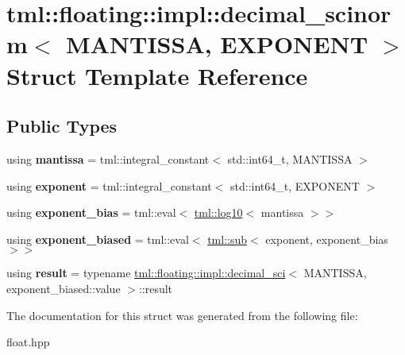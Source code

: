 \hypertarget{structtml_1_1floating_1_1impl_1_1decimal__scinorm}{\section{tml\+:\+:floating\+:\+:impl\+:\+:decimal\+\_\+scinorm$<$ M\+A\+N\+T\+I\+S\+S\+A, E\+X\+P\+O\+N\+E\+N\+T $>$ Struct Template Reference}
\label{structtml_1_1floating_1_1impl_1_1decimal__scinorm}
}
\subsection*{Public Types}
\begin{DoxyCompactItemize}
\item 
\hypertarget{structtml_1_1floating_1_1impl_1_1decimal__scinorm_a43b2abaea5ea0479eda2b942c8bf1ec8}{using {\bfseries mantissa} = tml\+::integral\+\_\+constant$<$ std\+::int64\+\_\+t, M\+A\+N\+T\+I\+S\+S\+A $>$}\label{structtml_1_1floating_1_1impl_1_1decimal__scinorm_a43b2abaea5ea0479eda2b942c8bf1ec8}

\item 
\hypertarget{structtml_1_1floating_1_1impl_1_1decimal__scinorm_ac8a1326c795a866dfc4bf527764b4558}{using {\bfseries exponent} = tml\+::integral\+\_\+constant$<$ std\+::int64\+\_\+t, E\+X\+P\+O\+N\+E\+N\+T $>$}\label{structtml_1_1floating_1_1impl_1_1decimal__scinorm_ac8a1326c795a866dfc4bf527764b4558}

\item 
\hypertarget{structtml_1_1floating_1_1impl_1_1decimal__scinorm_aae5e4b1eadec2dd82c9b692ad98eb03d}{using {\bfseries exponent\+\_\+bias} = tml\+::eval$<$ \hyperlink{structtml_1_1log10}{tml\+::log10}$<$ mantissa $>$$>$}\label{structtml_1_1floating_1_1impl_1_1decimal__scinorm_aae5e4b1eadec2dd82c9b692ad98eb03d}

\item 
\hypertarget{structtml_1_1floating_1_1impl_1_1decimal__scinorm_a9efd73be4a41eac814063fbb9a02aa52}{using {\bfseries exponent\+\_\+biased} = tml\+::eval$<$ \hyperlink{structtml_1_1sub}{tml\+::sub}$<$ exponent, exponent\+\_\+bias $>$$>$}\label{structtml_1_1floating_1_1impl_1_1decimal__scinorm_a9efd73be4a41eac814063fbb9a02aa52}

\item 
\hypertarget{structtml_1_1floating_1_1impl_1_1decimal__scinorm_a999660668c33740e69c9a14b1f7d79d3}{using {\bfseries result} = typename \hyperlink{structtml_1_1floating_1_1impl_1_1decimal__sci}{tml\+::floating\+::impl\+::decimal\+\_\+sci}$<$ M\+A\+N\+T\+I\+S\+S\+A, exponent\+\_\+biased\+::value $>$\+::result}\label{structtml_1_1floating_1_1impl_1_1decimal__scinorm_a999660668c33740e69c9a14b1f7d79d3}

\end{DoxyCompactItemize}


The documentation for this struct was generated from the following file\+:\begin{DoxyCompactItemize}
\item 
float.\+hpp\end{DoxyCompactItemize}
